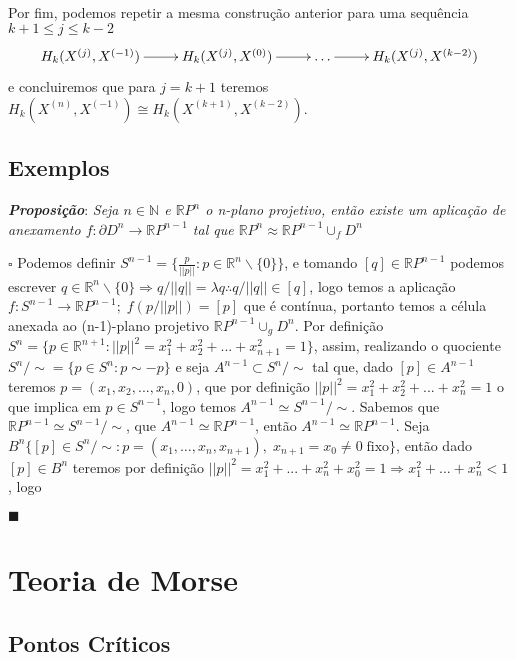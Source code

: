 \documentclass[12pt]{book}
\newcommand{\skeleton}[1]{X^{(#1)}}
\newcommand{\homologiarel}[3]{H_{#1}(#2,#3)}
\newcommand{\real}[1]{\mathbb{R}^{#1}}
\newcommand{\realprojetivo}[1]{\mathbb{R}P^{#1}}
\newcommand{\tese}[3]{\vspace{2mm} \textit{\textbf{#1}}: \textit{#2} \par $\square$ #3 \par $\blacksquare$}
\begin{document}
{	\vspace{2mm} Por fim, podemos repetir a mesma construção anterior para uma sequência $k+1 \leq j \leq k-2$
	\[
	\xymatrix{
		\homologiarel{k}{\skeleton{j}}{\skeleton{-1}}\ar[r]& \homologiarel{k}{\skeleton{j}}{\skeleton{0}} \ar[r] & \dots \ar[r] & \homologiarel{k}{\skeleton{j}}{\skeleton{k-2}}
	}
	\]
	e concluiremos que para $j = k+1$ teremos $\homologiarel{k}{\skeleton{n}}{\skeleton{-1}} \cong \homologiarel{k}{\skeleton{k+1}}{\skeleton{k-2}}$.
	}
	
	\section{Exemplos}
	\tese{Proposição}{Seja $n \in \mathbb{N}$ e $\realprojetivo{n}$ o n-plano projetivo, então existe um aplicação de anexamento $f: \partial{D^{n}} \to \realprojetivo{n-1}$ tal que $\realprojetivo{n} \approx \realprojetivo{n-1} \cup_{f} D^{n}$}{Podemos definir $S^{n-1} =\{\frac{p}{||p||}: p  \in \real{n}\backslash\{0\}\}$, e tomando $[q] \in \realprojetivo{n-1}$ podemos escrever $q \in \real{n}\backslash\{0\} \Rightarrow q/||q|| = \lambda q \therefore q/||q|| \in [q]$, logo temos a aplicação  $f:S^{n-1} \to \realprojetivo{n-1}; \; f(p/||p||) = [p]$ que é contínua, portanto temos a célula anexada ao (n-1)-plano projetivo $\realprojetivo{n-1}\cup_{g}D^{n}$. Por definição $S^{n} = \{p \in \real{n+1}: ||p||^{2} = x_{1}^{2}+x_{2}^{2}+...+x_{n+1}^{2}=1\}$, assim, realizando o quociente $S^{n}/\sim = \{p \in S^{n}: p \sim -p\}$ e seja $A^{n-1} \subset S^{n}/\sim$ tal que, dado $[p] \in A^{n-1}$ teremos $p = (x_{1},x_{2},...,x_{n}, 0)$, que por definição $||p||^{2} = x_{1}^{2}+x_{2}^{2}+...+x_{n}^{2}=1$ o que implica em $p \in S^{n-1}$, logo temos $A^{n-1} \simeq S^{n-1}/\sim$. Sabemos que $\realprojetivo{n-1} \simeq S^{n-1}/\sim$, que $A^{n-1} \simeq \realprojetivo{n-1}$, então $A^{n-1} \simeq \realprojetivo{n-1}$. Seja $B^{n} \{[p] \in S^{n}/\sim: p =(x_{1},\dots,x_{n}, x_{n+1}), \; x_{n+1} = x_{0}\neq 0 \;\text{fixo} \}$, então dado $[p] \in B^{n}$ teremos por definição $||p||^{2} = x_{1}^{2}+...+x_{n}^{2}+x_{0}^{2}=1 \Rightarrow x_{1}^{2}+...+x_{n}^{2}<1$, logo }
	

	
	
	\chapter{Teoria de Morse}
	\section{Pontos Críticos}
	
\end{document}
